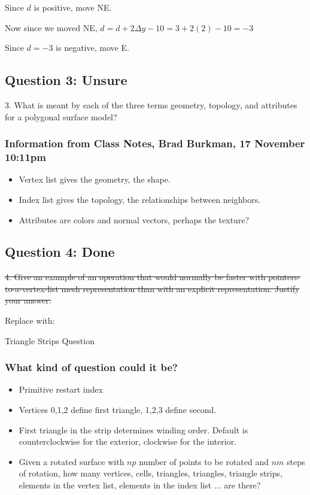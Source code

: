 \documentclass[11pt]{article}
\begin{document}
\begin{spacing}{1.2}
Since $d$ is positive, move NE.  

Now since we moved NE, $d = d+2 \Delta y - 10 = 3 + 2(2) - 10 = -3$

Since $d = -3$ is negative, move E.



\subsection{Question 3:  Unsure}
3.  What is meant by each of the three terms geometry, topology, and attributes for a polygonal surface model?

\subsubsection{Information from Class Notes, Brad Burkman, 17 November 10:11pm}

\begin{itemize}
	\item Vertex list gives the geometry, the shape.  
	\item Index list gives the topology, the relationships between neighbors.  
	\item Attributes are colors and normal vectors, perhaps the texture?
\end{itemize}

\subsection{Question 4:  Done}

\sout{4.  Give an example of an operation that would normally be faster with pointers-to-a-vertex-list mesh representation than with an explicit representation.  Justify your answer.  }

Replace with:

Triangle Strips Question

\subsubsection{What kind of question could it be?}

\begin{itemize}
	\item Primitive restart index
	\item Vertices 0,1,2 define first triangle, 1,2,3 define second. 
	\item First triangle in the strip determines winding order.  Default is counterclockwise for the exterior, clockwise for the interior.  
	\item Given a rotated surface with $np$ number of points to be rotated and $nm$ steps of rotation, how many vertices, cells, triangles, triangles, triangle strips, elements in the vertex list, elements in the index list ... are there?
\end{itemize}



\end{spacing}
\end{document}
